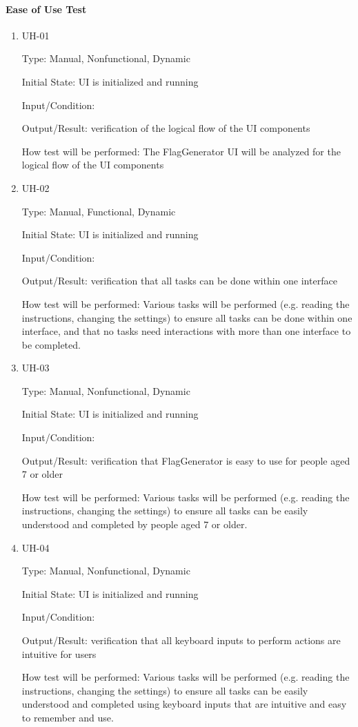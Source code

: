 \documentclass[12pt, titlepage]{article}
\begin{document}
\paragraph{Ease of Use Test}

\begin{enumerate}

\item{UH-01\\}

Type: Manual, Nonfunctional, Dynamic

Initial State: UI is initialized and running

Input/Condition: 

Output/Result: verification of the logical flow of the UI components

How test will be performed: The FlagGenerator UI will be analyzed for the
logical flow of the UI components

\item{UH-02\\}

Type: Manual, Functional, Dynamic

Initial State: UI is initialized and running

Input/Condition: 

Output/Result: verification that all tasks can be done within one interface

How test will be performed: Various tasks will be performed (e.g. reading the
instructions, changing the settings) to ensure all tasks can be done within
one interface, and that no tasks need interactions with more than one
interface to be completed.

\item{UH-03\\}

Type: Manual, Nonfunctional, Dynamic

Initial State: UI is initialized and running

Input/Condition: 

Output/Result: verification that FlagGenerator is easy to use for people aged
7 or older

How test will be performed: Various tasks will be performed (e.g. reading the
instructions, changing the settings) to ensure all tasks can be easily
understood and completed by people aged 7 or older.

\item{UH-04\\}

Type: Manual, Nonfunctional, Dynamic

Initial State: UI is initialized and running

Input/Condition: 

Output/Result: verification that all keyboard inputs to perform actions are
intuitive for users

How test will be performed: Various tasks will be performed (e.g. reading the
instructions, changing the settings) to ensure all tasks can be easily
understood and completed using keyboard inputs that are intuitive and easy to
remember and use.

\end{enumerate}
\end{document}
